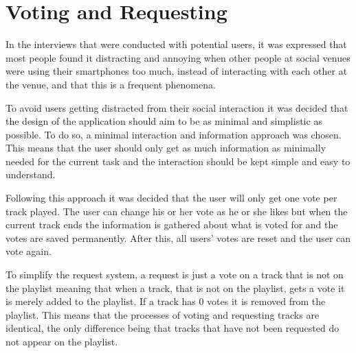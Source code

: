 \section{Voting and Requesting}
\label{VotingAndRequesting}
In the interviews that were conducted with potential users, it was expressed that most people found it distracting and annoying when other people at social venues were using their smartphones too much, instead of interacting with each other at the venue, and that this is a frequent phenomena.

To avoid users getting distracted from their social interaction it was decided that the design of the application should aim to be as minimal and simplistic as possible. To do so, a minimal interaction and information approach was chosen. This means that the user should only get as much information as minimally needed for the current task and the interaction should be kept simple and easy to understand.

Following this approach it was decided that the user will only get one vote per track played. The user can change his or her vote as he or she likes but when the current track ends the information is gathered about what is voted for and the votes are saved permanently. After this, all users' votes are reset and the user can vote again.

To simplify the request system, a request is just a vote on a track that is not on the playlist meaning that when a track, that is not on the playlist, gets a vote it is merely added to the playlist. If a track has 0 votes it is removed from the playlist. This means that the processes of voting and requesting tracks are identical, the only difference being that tracks that have not been requested do not appear on the playlist.